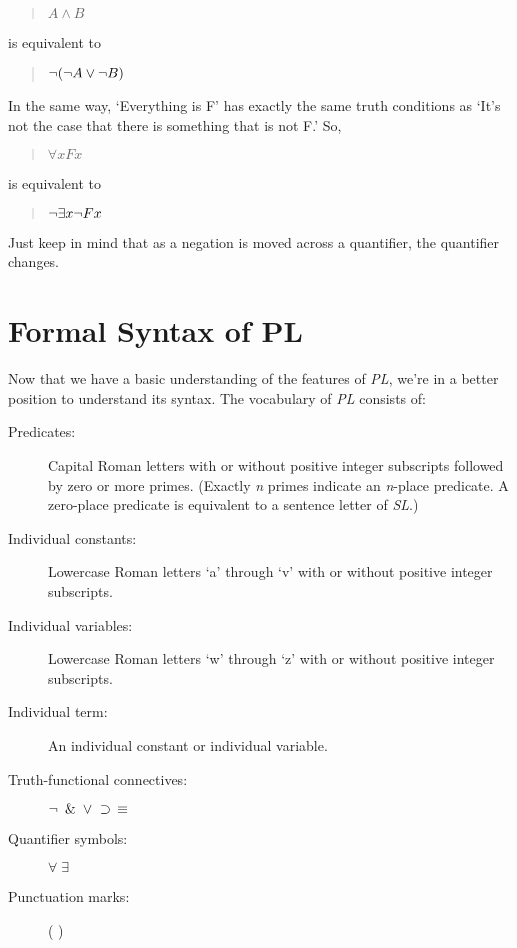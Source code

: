 \documentclass[../logic-text.tex]{subfiles}
\begin{document}
\begin{quote}
  \(A \land B\)
\end{quote}

\noindent is equivalent to

\begin{quote}
  \(\neg ( \neg A \lor \neg B )\)
\end{quote}

In the same way, \enquote*{Everything is F} has exactly the same truth conditions as \enquote*{It's not the case that there is something that is not F.}
So,

\begin{quote}
  \(\forall xFx\)
\end{quote}

\noindent is equivalent to

\begin{quote}
  \(\neg \exists x \neg Fx\)
\end{quote}

\noindent Just keep in mind that as a negation is moved across a quantifier, the quantifier changes.
 
\section{Formal Syntax of PL}
\label{sec:formal-syntax-pl}

Now that we have a basic understanding of the features of \emph{PL}, we're in a better position to understand its syntax.
The vocabulary of \emph{PL} consists of:

\begin{description}
  \item[Predicates:] Capital Roman letters with or without positive integer subscripts followed by zero or more primes.
        (Exactly \emph{n} primes indicate an \emph{n}-place predicate.
        A zero-place predicate is equivalent to a sentence letter of \emph{SL}.)
  \item[Individual constants:] Lowercase Roman letters \enquote*{a} through \enquote*{v} with or without positive integer subscripts.
  \item[Individual variables:] Lowercase Roman letters \enquote*{w} through \enquote*{z} with or without positive integer subscripts.
  \item[Individual term:] An individual constant or individual variable.
  \item[Truth-functional connectives:] \(\neg \; \mathbin{\&} \; \lor \; \supset \; \, \equiv  \)
  \item[Quantifier symbols:] \(\forall \; \exists\)
  \item[Punctuation marks:] ( \; )
\end{description}
\end{document}
